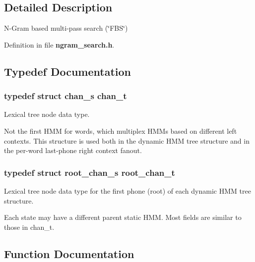 \subsection{\-Detailed \-Description}
\-N-\/\-Gram based multi-\/pass search (\char`\"{}\-F\-B\-S\char`\"{}) 

\-Definition in file {\bf ngram\-\_\-search.\-h}.



\subsection{\-Typedef \-Documentation}
\subsubsection[{chan\-\_\-t}]{\setlength{\rightskip}{0pt plus 5cm}typedef struct {\bf chan\-\_\-s}  {\bf chan\-\_\-t}}\label{ngram__search_8h_a2c5740fe4792d870b73f4100b32e9324}


\-Lexical tree node data type. 

\-Not the first \-H\-M\-M for words, which multiplex \-H\-M\-Ms based on different left contexts. \-This structure is used both in the dynamic \-H\-M\-M tree structure and in the per-\/word last-\/phone right context fanout. 
\subsubsection[{root\-\_\-chan\-\_\-t}]{\setlength{\rightskip}{0pt plus 5cm}typedef struct {\bf root\-\_\-chan\-\_\-s}  {\bf root\-\_\-chan\-\_\-t}}\label{ngram__search_8h_aab8eee3f73f666d0e12c5b355a651cff}


\-Lexical tree node data type for the first phone (root) of each dynamic \-H\-M\-M tree structure. 

\-Each state may have a different parent static \-H\-M\-M. \-Most fields are similar to those in chan\-\_\-t. 

\subsection{\-Function \-Documentation}
